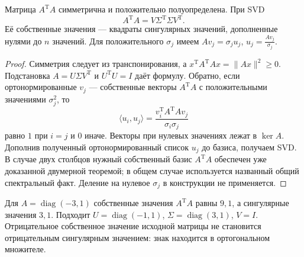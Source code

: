 \ifdim\dimexpr\ht\CatFlowBox+\dp\CatFlowBox\relax<61mm\dp\CatFlowBox=\dimexpr61mm-\ht\CatFlowBox\relax\fi%
\noindent\usebox{\CatFlowBox}\par\addvspace{2pt}
\begin{theorem}\label{thm:review-ml-svd}
Матрица \(A^{\mathrm T}A\) симметрична и положительно полуопределена. При SVD
\[A^{\mathrm T}A=V\Sigma^{\mathrm T}\Sigma V^{\mathrm T}.\]
Её собственные значения --- квадраты сингулярных значений, дополненные нулями до \(n\) значений. Для положительного \(\sigma_j\) имеем \(Av_j=\sigma_j u_j\), \(u_j=\frac{Av_j}{\sigma_j}\).
\end{theorem}
\begin{proof}Симметрия следует из транспонирования, а \(x^{\mathrm T}A^{\mathrm T}Ax=\|Ax\|^2\ge0\). Подстановка \(A=U\Sigma V^{\mathrm T}\) и \(U^{\mathrm T}U=I\) даёт формулу. Обратно, если ортонормированные \(v_j\) --- собственные векторы \(A^{\mathrm T}A\) с положительными значениями \(\sigma_j^2\), то
\[\langle u_i,u_j\rangle=\frac{v_i^{\mathrm T}A^{\mathrm T}Av_j}{\sigma_i\sigma_j}\]
равно \(1\) при \(i=j\) и \(0\) иначе. Векторы при нулевых значениях лежат в \(\ker A\). Дополнив полученный ортонормированный список \(u_j\) до базиса, получаем SVD. В случае двух столбцов нужный собственный базис \(A^{\mathrm T}A\) обеспечен уже доказанной двумерной теоремой; в общем случае используется названный общий спектральный факт. Деление на нулевое \(\sigma_j\) в конструкции не применяется.\end{proof}
\begin{example}Для \(A=\operatorname{diag}(-3,1)\) собственные значения \(A^{\mathrm T}A\) равны \(9,1\), а сингулярные значения \(3,1\). Подходит \(U=\operatorname{diag}(-1,1)\), \(\Sigma=\operatorname{diag}(3,1)\), \(V=I\). Отрицательное собственное значение исходной матрицы не становится отрицательным сингулярным значением: знак находится в ортогональном множителе.\end{example}
